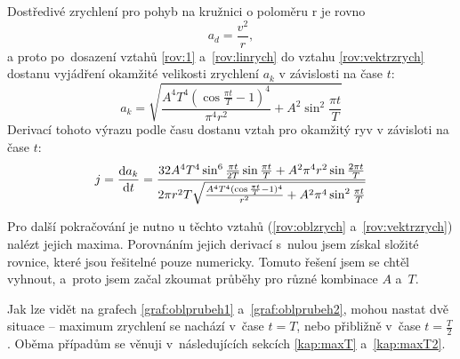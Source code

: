 	Dostředivé zrychlení pro pohyb na kružnici o poloměru r je rovno
	\begin{equation}
		a_d = \frac{v^2}{r},
	\end{equation}
	a proto po~dosazení vztahů \ref{rov:1} a~\ref{rov:linrych} do vztahu \ref{rov:vektrzrych} dostanu vyjádření okamžité velikosti zrychlení $a_k$ v závislosti na čase $t$:
	\begin{equation}
		\label{rov:oblzrych}
		a_k=\sqrt{\frac{A^4 T^4 \left(\cos \frac{\pi  t}{T}-1\right)^4}{\pi ^4
		   r^2}+A^2 \sin ^2\frac{\pi  t}{T}}
	\end{equation}
	Derivací tohoto výrazu podle času dostanu vztah pro okamžitý ryv v závisloti na čase $t$:
	\begin{equation}
		\label{rov:oblryv}
		j=\frac{\dif a_k}{\dif t}=\frac{32A^4T^4 \sin^6 \frac{\pi t}{2T}\sin\frac{\pi t}{T}+A^2\pi^4r^2\sin\frac{2\pi t}{T}}{2\pi r^2T\sqrt{\frac{A^4T^4(\cos \frac{\pi t}{T}-1)^4}{r^2}+A^2\pi^4\sin^2\frac{\pi t}{T}}}
	\end{equation}
	
	Pro další pokračování je nutno u těchto vztahů (\ref{rov:oblzrych} a~\ref{rov:vektrzrych}) nalézt jejich maxima. Porovnáním jejich derivací s~nulou jsem získal složité rovnice, které jsou řešitelné pouze numericky. Tomuto řešení jsem se chtěl vyhnout, a~proto jsem začal zkoumat průběhy pro různé kombinace $A$ a~$T$.
	
	Jak lze vidět na grafech \ref{graf:oblprubeh1} a~\ref{graf:oblprubeh2}, mohou nastat dvě situace -- maximum zrychlení se nachází v~čase $t=T$, nebo přibližně v~čase $t=\frac{T}{2}$. Oběma případům se věnuji v~následujících sekcích \ref{kap:maxT} a~\ref{kap:maxT2}.
	
